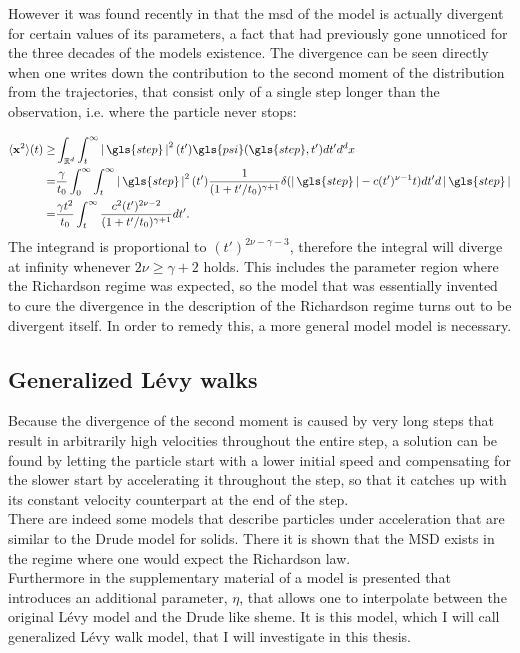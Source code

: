 


However it was found recently in \cite{radons2018} that the \gls{msd} of the model is actually divergent for certain values of its parameters, a fact that had previously gone unnoticed for the three decades of the models existence. 
The divergence can be seen directly when one writes down the contribution to the second moment of the distribution from the trajectories, that consist only of a single step longer than the observation, i.e. where the particle never stops:

\begin{align}
\mean{\ve{x}^2}(t) \geq& \int_{\mathbb{R}^d} \int_{t}^{\infty} \abs{\gls{step}}^{2}(t') \gls{psi}(\gls{step},t') dt' d^{d}x \\
=& \frac{\gamma}{t_0} \int_{0}^{\infty} \int_{t}^{\infty} \abs{\gls{step}}^{2}(t')  \frac{1}{(1+t'/t_0)^{\gamma+1}}  \delta(\abs{\gls{step}} - c (t')^{\nu-1}t)  dt' d\abs{\gls{step}} \\
=& \frac{\gamma t^2}{t_0}  \int_{t}^{\infty}   \frac{c^2 (t')^{2\nu-2}}{(1+t'/t_0)^{\gamma+1}}    dt'  .
\end{align}
%
The integrand is proportional to $(t')^{2\nu-\gamma-3}$, therefore the integral will diverge at infinity whenever $2 \nu \geq \gamma +2$ holds. This includes the parameter region where the Richardson regime was expected, so the model that was essentially invented to cure the divergence in the description of the Richardson regime turns out to be divergent itself. In order to remedy this, a more general model model is necessary.


\subsection{Generalized L\'evy walks}

Because the divergence of the second moment is caused by very long steps that result in arbitrarily high velocities throughout the entire step, a solution can be found by letting the particle start with a lower initial speed and compensating for the slower start by accelerating it throughout the step, so that it catches up with its constant velocity counterpart at the end of the step. \\
There are indeed some models that describe particles under acceleration \cite{schulz1997, BarkaiKlafterBuch} that are similar to the Drude model for solids. There it is shown that the MSD exists in the regime where one would expect the Richardson law. \\
Furthermore in the supplementary material of \cite{radons2018} a model is presented that introduces an additional parameter, $\eta$, that allows one to interpolate between the original L\'evy model and the Drude like sheme. It is this model, which I will call generalized L\'evy walk model, that I will investigate in this thesis. \\

